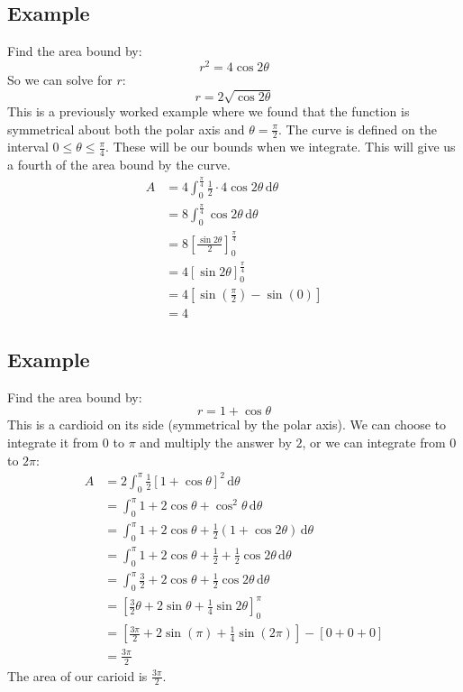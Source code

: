 \documentclass{report}
\begin{document}
    \subsection{Example}
        Find the area bound by:
        \[r^2 = 4 \cos 2 \theta\]
        So we can solve for \(r\):
        \[r = 2 \sqrt{\cos 2 \theta}\]
        This is a previously worked example where we found that the function is symmetrical about both the polar axis and \(\theta = \frac{\pi}{2}\).
        The curve is defined on the interval \(0 \leq \theta \leq \frac{\pi}{4}\).
        These will be our bounds when we integrate.
        This will give us a fourth of the area bound by the curve.
        \begin{align*}
            A &= 4 \int_0^{\frac{\pi}{4}} \frac{1}{2} \cdot 4 \cos 2 \theta \, \mathrm{d} \theta\\
            &= 8 \int_0^{\frac{\pi}{4}} \cos 2 \theta \, \mathrm{d} \theta \\
            &= 8 \left[ \frac{\sin 2 \theta}{2} \right]_0^{\frac{\pi}{4}} \\
            &= 4 \left[ \sin 2 \theta \right]_0^{\frac{\pi}{4}} \\
            &= 4 \left[ \sin (\frac{\pi}{2}) - \sin (0) \right] \\
            &= 4
        \end{align*}
    
    \subsection{Example}
        Find the area bound by:
        \[r = 1 + \cos \theta\]
        This is a cardioid on its side (symmetrical by the polar axis).
        We can choose to integrate it from \(0\) to \(\pi\) and multiply the answer by \(2\), or we can integrate from \(0\) to \(2 \pi\):
        \begin{align*}
            A &= 2 \int_0^\pi \frac{1}{2} \left[1 + \cos \theta\right]^2 \, \mathrm{d} \theta \\
            &= \int_0^\pi 1 + 2 \cos \theta + \cos^2 \theta \, \mathrm{d} \theta \\
            &= \int_0^\pi 1 + 2 \cos \theta + \frac{1}{2} (1 + \cos 2 \theta) \, \mathrm{d} \theta \\
            &= \int_0^\pi 1 + 2 \cos \theta + \frac{1}{2} + \frac{1}{2} \cos 2 \theta \, \mathrm{d} \theta \\
            &= \int_0^\pi \frac{3}{2} + 2 \cos \theta + \frac{1}{2} \cos 2 \theta \, \mathrm{d} \theta \\
            &= \left[ \frac{3}{2} \theta + 2 \sin \theta + \frac{1}{4} \sin 2 \theta\right]_0^\pi \\
            &= \left[ \frac{3 \pi}{2} + 2 \sin (\pi) + \frac{1}{4} \sin (2 \pi)\right] - \left[0 + 0 + 0\right] \\
            &= \frac{3 \pi}{2}
        \end{align*}
        The area of our carioid is \(\frac{3 \pi}{2}\).
    
\end{document}
